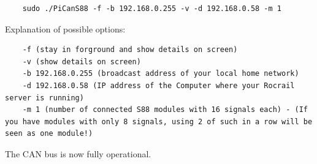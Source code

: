 \begin{verbatim}
	sudo ./PiCanS88 -f -b 192.168.0.255 -v -d 192.168.0.58 -m 1
\end{verbatim}

Explanation of possible options:
\begin{verbatim}
	-f (stay in forground and show details on screen)
	-v (show details on screen)
	-b 192.168.0.255 (broadcast address of your local home network)
	-d 192.168.0.58 (IP address of the Computer where your Rocrail server is running)
	-m 1 (number of connected S88 modules with 16 signals each) - (If you have modules with only 8 signals, using 2 of such in a row will be seen as one module!)
\end{verbatim}

The CAN bus is now fully operational. 

